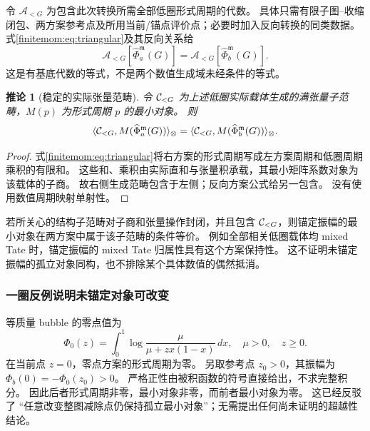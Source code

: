 \documentclass[11pt,a4paper,oneside]{ctexart}
\theoremstyle{cnplain}
\newtheorem{corollary}[theorem]{推论}
\theoremstyle{definition}
\theoremstyle{remark}
\numberwithin{equation}{section}
\begin{document}
令 $\mathcal A_{<G}$ 为包含此次转换所需全部低圈形式周期的代数。
具体只需有限子图--收缩闭包、两方案参考点及所用当前/锚点评价点；必要时加入反向转换的同类数据。
式\eqref{finitemom:eq:triangular}及其反向关系给
\begin{equation}\label{finitemom:eq:algebra}
 \mathcal A_{<G}[\widehat\Phi_a^{\mathfrak m}(G)]
       =\mathcal A_{<G}[\widehat\Phi_b^{\mathfrak m}(G)].
\end{equation}
这是有基底代数的等式，不是两个数值生成域未经条件的等式。

\begin{corollary}[稳定的实际张量范畴]\label{finitemom:cor:category}
令 $\mathcal C_{<G}$ 为上述低圈实际载体生成的满张量子范畴，$M(p)$ 为形式周期 $p$ 的最小对象。
则
\begin{equation}\label{finitemom:eq:category}
 \langle\mathcal C_{<G},M(\widehat\Phi_a^{\mathfrak m}(G))\rangle_\otimes
 =\langle\mathcal C_{<G},M(\widehat\Phi_b^{\mathfrak m}(G))\rangle_\otimes.
\end{equation}
\end{corollary}
\begin{proof}
式\eqref{finitemom:eq:triangular}将右方案的形式周期写成左方案周期和低圈周期乘积的有限和。
这些和、乘积由实际直和与张量积承载，其最小矩阵系数对象为该载体的子商\cite{brownperiods}。
故右侧生成范畴包含于左侧；反向方案公式给另一包含。
没有使用数值周期映射单射性。
\end{proof}

若所关心的结构子范畴对子商和张量操作封闭，并且包含 $\mathcal C_{<G}$，则锚定振幅的最小对象在两方案中属于该子范畴的条件等价。
例如全部相关低圈载体均 mixed Tate 时，锚定振幅的 mixed Tate 归属性具有这个方案保持性。
这不证明未锚定振幅的孤立对象同构，也不排除某个具体数值的偶然抵消。

\subsubsection{一圈反例说明未锚定对象可改变}
等质量 bubble 的零点值为
\begin{equation}\label{finitemom:eq:bubble}
 \Phi_0(z)=\int_0^1\log\frac{\mu}{\mu+z x(1-x)}\,dx,
 \quad \mu>0,\quad z\geq0.
\end{equation}
在当前点 $z=0$，零点方案的形式周期为零。
另取参考点 $z_0>0$，其振幅为 $\Phi_b(0)=-\Phi_0(z_0)>0$。
严格正性由被积函数的符号直接给出，不求完整积分。
因此后者形式周期非零，最小对象非零，而前者最小对象为零。
这已经反驳了 ``任意改变整图减除点仍保持孤立最小对象''；无需提出任何尚未证明的超越性结论。


\endgroup
\end{document}
